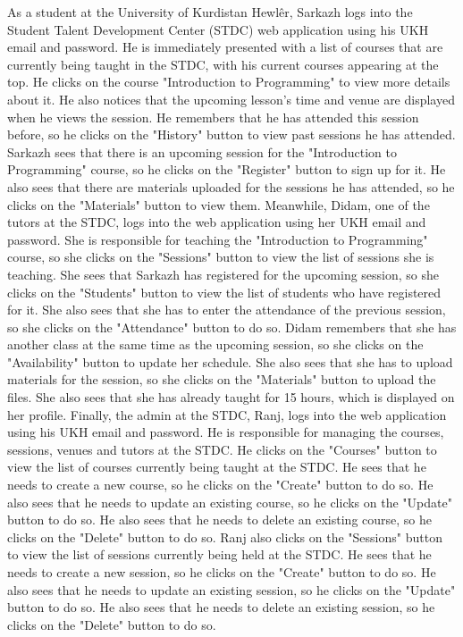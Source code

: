 \begin{justify}
    \noindent As a student at the University of Kurdistan Hewlêr, Sarkazh logs into the Student Talent Development Center (STDC) web application using his UKH email and password. He is immediately presented with a list of courses that are currently being taught in the STDC, with his current courses appearing at the top. He clicks on the course "Introduction to Programming" to view more details about it. He also notices that the upcoming lesson's time and venue are displayed when he views the session. He remembers that he has attended this session before, so he clicks on the "History" button to view past sessions he has attended.\newendline
    Sarkazh sees that there is an upcoming session for the "Introduction to Programming" course, so he clicks on the "Register" button to sign up for it. He also sees that there are materials uploaded for the sessions he has attended, so he clicks on the "Materials" button to view them. \newendline
    Meanwhile, Didam, one of the tutors at the STDC, logs into the web application using her UKH email and password. She is responsible for teaching the "Introduction to Programming" course, so she clicks on the "Sessions" button to view the list of sessions she is teaching. She sees that Sarkazh has registered for the upcoming session, so she clicks on the "Students" button to view the list of students who have registered for it. She also sees that she has to enter the attendance of the previous session, so she clicks on the "Attendance" button to do so.\newendline
    Didam remembers that she has another class at the same time as the upcoming session, so she clicks on the "Availability" button to update her schedule. She also sees that she has to upload materials for the session, so she clicks on the "Materials" button to upload the files. She also sees that she has already taught for 15 hours, which is displayed on her profile.\newendline
    Finally, the admin at the STDC, Ranj, logs into the web application using his UKH email and password. He is responsible for managing the courses, sessions, venues and tutors at the STDC. He clicks on the "Courses" button to view the list of courses currently being taught at the STDC. He sees that he needs to create a new course, so he clicks on the "Create" button to do so. He also sees that he needs to update an existing course, so he clicks on the "Update" button to do so. He also sees that he needs to delete an existing course, so he clicks on the "Delete" button to do so. \newendline
    Ranj also clicks on the "Sessions" button to view the list of sessions currently being held at the STDC. He sees that he needs to create a new session, so he clicks on the "Create" button to do so. He also sees that he needs to update an existing session, so he clicks on the "Update" button to do so. He also sees that he needs to delete an existing session, so he clicks on the "Delete" button to do so. \newendline

\end{justify}
